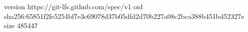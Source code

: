 version https://git-lfs.github.com/spec/v1
oid sha256:65851f2fe5254bf7e3c69078d37b05dfd2d70b227a08c2bca388b451bd52327e
size 485447
